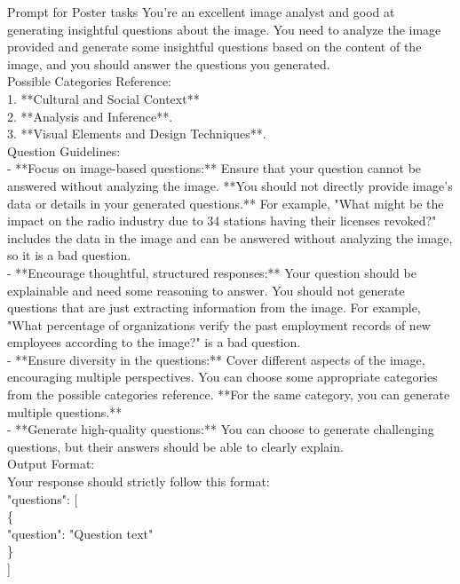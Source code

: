 \begin{figure*}[!ht] 
\begin{AIbox}{Prompt for Poster tasks}
{You're an excellent image analyst and good at generating insightful questions about the image. You need to analyze the image provided and generate some insightful questions based on the content of the image, and you should answer the questions you generated.\\
Possible Categories Reference:\\
1. **Cultural and Social Context**\\
2. **Analysis and Inference**.\\
3. **Visual Elements and Design Techniques**.\\
Question Guidelines:\\
- **Focus on image-based questions:** Ensure that your question cannot be answered without analyzing the image. **You should not directly provide image's data or details in your generated questions.** For example, "What might be the impact on the radio industry due to 34 stations having their licenses revoked?" includes the data in the image and can be answered without analyzing the image, so it is a bad question.\\
- **Encourage thoughtful, structured responses:** Your question should be explainable and need some reasoning to answer. You should not generate questions that are just extracting information from the image. For example, "What percentage of organizations verify the past employment records of new employees according to the image?" is a bad question.\\
- **Ensure diversity in the questions:** Cover different aspects of the image, encouraging multiple perspectives. You can choose some appropriate categories from the possible categories reference. **For the same category, you can generate multiple questions.**\\
- **Generate high-quality questions:** You can choose to generate challenging questions, but their answers should be able to clearly explain. \\

Output Format:\\
Your response should strictly follow this format:\\

"questions": [\\
\{\\
"question": "Question text"\\
\}\\
]
}
\end{AIbox} 
\caption{\textbf{An Example of the prompt for Diagram task generation. }}
\label{fig: prompt_info}
\end{figure*}

